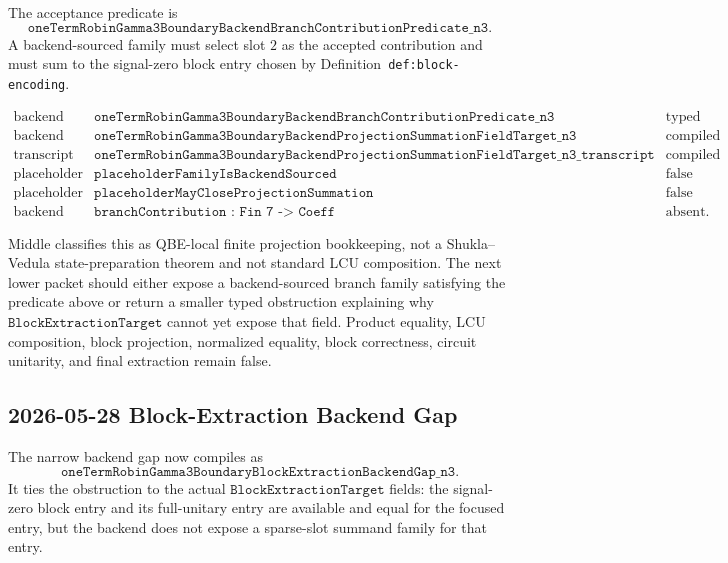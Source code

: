 The acceptance predicate is
\[
  \texttt{oneTermRobinGamma3BoundaryBackendBranchContributionPredicate\_n3}.
\]
A backend-sourced family must select slot \(2\) as the accepted contribution
and must sum to the signal-zero block entry chosen by
Definition~\texttt{def:block-encoding}.

\[
\begin{array}{lll}
\text{backend predicate} &
\texttt{oneTermRobinGamma3BoundaryBackendBranchContributionPredicate\_n3} &
\text{typed}\\
\text{backend target} &
\texttt{oneTermRobinGamma3BoundaryBackendProjectionSummationFieldTarget\_n3} &
\text{compiled}\\
\text{transcript} &
\texttt{oneTermRobinGamma3BoundaryBackendProjectionSummationFieldTarget\_n3\_transcript} &
\text{compiled}\\
\text{placeholder source} &
\texttt{placeholderFamilyIsBackendSourced} &
\text{false}\\
\text{placeholder closure} &
\texttt{placeholderMayCloseProjectionSummation} &
\text{false}\\
\text{backend field} &
\texttt{branchContribution : Fin\ 7 -> Coeff} &
\text{absent}.
\end{array}
\]

Middle classifies this as QBE-local finite projection bookkeeping, not a
Shukla--Vedula state-preparation theorem and not standard LCU composition.
The next lower packet should either expose a backend-sourced branch family
satisfying the predicate above or return a smaller typed obstruction explaining
why \(\texttt{BlockExtractionTarget}\) cannot yet expose that field.  Product
equality, LCU composition, block projection, normalized equality, block
correctness, circuit unitarity, and final extraction remain false.

\subsection{2026-05-28 Block-Extraction Backend Gap}

The narrow backend gap now compiles as
\[
  \texttt{oneTermRobinGamma3BoundaryBlockExtractionBackendGap\_n3}.
\]
It ties the obstruction to the actual \(\texttt{BlockExtractionTarget}\)
fields: the signal-zero block entry and its full-unitary entry are available
and equal for the focused entry, but the backend does not expose a sparse-slot
summand family for that entry.

